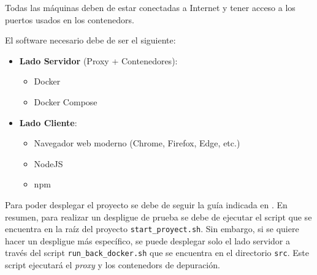 Todas las máquinas deben de estar conectadas a Internet y tener acceso a los puertos usados en los \glspl{contenedor}.

El software necesario debe de ser el siguiente:
\begin{itemize}
    \item \textbf{Lado Servidor} (Proxy + Contenedores):
    \begin{itemize}
        \item Docker
        \item Docker Compose
    \end{itemize}
    \item \textbf{Lado Cliente}:
    \begin{itemize}
        \item Navegador web moderno (Chrome, Firefox, Edge, etc.)
        \item NodeJS
        \item npm
    \end{itemize}   
\end{itemize}

Para poder desplegar el proyecto se debe de seguir la guía indicada en .
En resumen, para realizar un despligue de prueba se debe de ejecutar el script que se encuentra en la raíz del proyecto \texttt{start\_proyect.sh}. Sin embargo, si se quiere hacer un despligue más específico, se puede desplegar solo el lado servidor a través del script \texttt{run\_back\_docker.sh} que se encuentra en el directorio \texttt{src}. Este script ejecutará el \textit{\gls{proxy}} y los \glspl{contenedor} de depuración.
